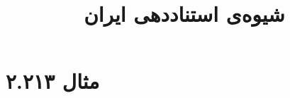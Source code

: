 \documentclass[a4paper,10pt]{article}
\begin{document}
\title{شیوه‌ی استناددهی ایران}
\author{}
\date{}
\maketitle



\section*{مثال ۲.۲۱۳}

\cite{علیدوستی1385}\\
\cite{شیری2000}\\
\begin{latin}\noindent
\cite{feber1971}\\
\cite{alarco1971}\\
\end{latin}






\end{document}
